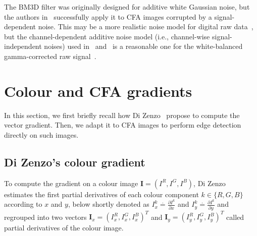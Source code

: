 \documentclass[twoside]{article}
\begin{document}
The BM3D filter was originally designed for additive white Gaussian noise, but the authors in~\cite{danielyan_lnla_2009} successfully apply it to CFA images corrupted by a signal-dependent noise. This may be a more realistic noise model for digital raw data~\cite{seybold_ism_2013}, but the channel-dependent additive noise model (i.e., channel-wise signal-independent noises) used in~\cite{zhang_ip_2009} and~\cite{akiyama_icip_2015} is a reasonable one for the white-balanced gamma-corrected raw signal~\cite{jeon_ip_2013}.



\section{Colour and CFA gradients}
\label{sec:gradients}

In this section, we first briefly recall how Di Zenzo~\cite{zenzo_cvgip_1986} propose to compute the vector gradient. Then, we adapt it to CFA images to perform edge detection directly on such images.


\subsection{Di Zenzo's colour gradient}
\label{subsec:colour_gradient}

To compute the gradient on a colour image $\mathbf{I}=\left(I^R,I^G,I^B\right)$, Di Zenzo~\cite{zenzo_cvgip_1986} estimates the first partial derivatives of each colour component $k \in \{R,G,B\}$ according to $x$ and $y$, below shortly denoted as $I^k_x \stackrel{\cdot}{=} \frac{\partial I^k}{\partial x}$ and $I_y^k \stackrel{\cdot}{=} \frac{\partial I^k}{\partial y}$ and regrouped into two vectors $\mathbf{I}_x = \left( I^R_x, I^G_x, I^B_x \right) ^T$ and $\mathbf{I}_y = \left( I^R_y, I^G_y, I^B_y \right) ^T$ called partial derivatives of the colour image. 
\end{document}
